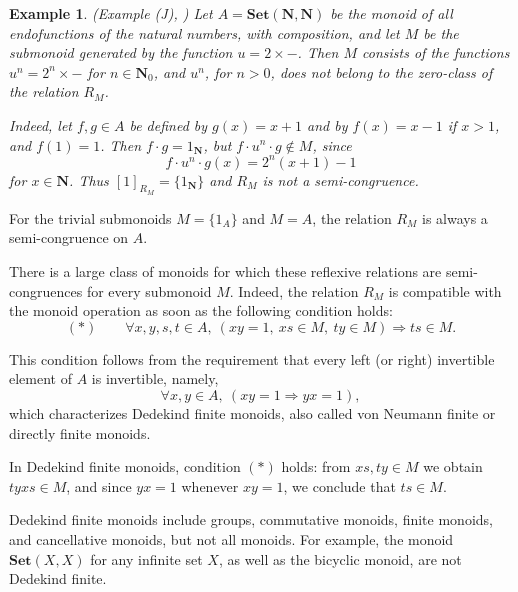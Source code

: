 \documentclass[12pt]{article}
\newcommand{\Set}{\mathbf{Set}}
\newtheorem{example}{Example}
\begin{document}

\begin{example}\em (Example (J), \cite{MFS3})
Let $A=\Set(\mathbf{N},\mathbf{N})$ be the monoid of all endofunctions of the natural numbers, with composition, and let $M$ be the submonoid generated by the function $u=2\times -$. Then $M$ consists of the functions $u^n=2^n\times -$ for $n\in\mathbf{N}_0$, and $u^n$, for $n>0$, does not belong to the zero-class of the relation $R_M$.

Indeed, let $f,g\in A$ be defined by $g(x)=x+1$ and by $f(x)=x-1$ if $x>1$, and $f(1)=1$. Then $f\cdot g=1_{\mathbf{N}}$, but
$f\cdot u^n\cdot g\notin M$, since
\[
f\cdot u^n\cdot g(x)=2^n(x+1)-1
\]
for $x\in\mathbf{N}$. Thus $[1]_{R_M}=\{1_{\mathbf{N}}\}$ and $R_M$ is not a semi-congruence.
\end{example}

For the trivial submonoids $M=\{1_A\}$ and $M=A$, the relation $R_M$ is always a semi-congruence on $A$.

There is a large class of monoids for which these reflexive relations are semi-congruences for every submonoid $M$. Indeed, the relation $R_M$ is compatible with the monoid operation as soon as the following condition holds:
\begin{equation}
(*)\qquad
\forall x,y,s,t\in A,\ (xy=1,\ xs\in M,\ ty\in M)\Rightarrow ts\in M.
\end{equation}

This condition follows from the requirement that every left (or right) invertible element of $A$ is invertible, namely,
\[
\forall x,y\in A,\ (xy=1\Rightarrow yx=1),
\]
which characterizes Dedekind finite monoids, also called von Neumann finite or directly finite monoids.

In Dedekind finite monoids, condition $(*)$ holds: from $xs,ty\in M$ we obtain $tyxs\in M$, and since $yx=1$ whenever $xy=1$, we conclude that $ts\in M$.

Dedekind finite monoids include groups, commutative monoids, finite monoids, and cancellative monoids, but not all monoids. For example, the monoid $\Set(X,X)$ for any infinite set $X$, as well as the bicyclic monoid, are not Dedekind finite.
\end{document}
